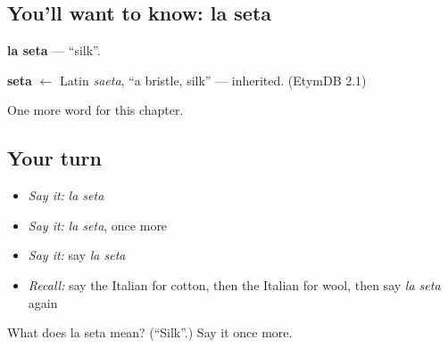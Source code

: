\subsection*{You'll want to know: la seta}
\textbf{la seta} — \textquotedblleft{}silk\textquotedblright{}.

\begin{cousinweb}
\textbf{seta} $\leftarrow$ Latin \emph{saeta}, \textquotedblleft{}a bristle, silk\textquotedblright{} — inherited. (EtymDB 2.1)
\end{cousinweb}

\begin{grammarlens}[title={What you've built}]
One more word for this chapter.
\end{grammarlens}

\subsection*{Your turn}
\begin{itemize}
\raggedright
  \item \emph{Say it:} \emph{la seta}
  \item \emph{Say it:} \emph{la seta}, once more
  \item \emph{Say it:} say \emph{la seta}
  \item \emph{Recall:} say the Italian for cotton, then the Italian for wool, then say \emph{la seta} again
\end{itemize}

\begin{tcolorbox}[breakable,colback=teal!4,colframe=teal!35!black,title={Before you move on}]
What does la seta mean? (\textquotedblleft{}Silk\textquotedblright{}.) Say it once more.
\end{tcolorbox}
